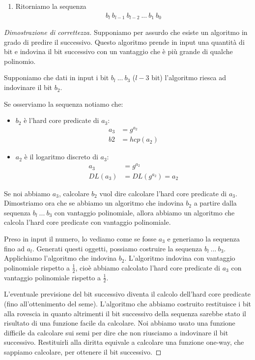 \begin{enumerate}
    \item Ritorniamo la sequenza
    \begin{align*}
        b_{l} \ b_{l-1} \ b_{l-2} \ ... \ b_{1} \ b_{0}
    \end{align*}
       
\end{enumerate}

\begin{proof}[Dimostrazione di correttezza]
    Supponiamo per assurdo che esiste un algoritmo in grado di predire il successivo. Questo algoritmo prende in input una quantità di bit e indovina il bit successivo con un vantaggio che è più grande di qualche polinomio. 

    Supponiamo che dati in input i bit $b_l \ ... \ b_3$ ($l-3$ bit) l'algoritmo riesca ad indovinare il bit $b_2$. 

    Se osserviamo la sequenza notiamo che:
    \begin{itemize}
        \item $b_2$ è l'hard core predicate di $a_3$:
        \begin{align*}
            a_3 &= g^{a_2}\\
            b2 &= hcp(a_2)
        \end{align*}
        \item $a_2$ è il logaritmo discreto di $a_3$:
        \begin{align*}
            a_3 &= g^{a_2}\\
           DL(a_3) &= DL(g^{a_2}) = a_2
        \end{align*}
    \end{itemize}

    \noindent Se noi abbiamo $a_3$, calcolare $b_2$ vuol dire calcolare l'hard core predicate di $a_3$. Dimostriamo ora che se abbiamo un algoritmo che indovina $b_2$ a partire dalla sequenza $b_l \ ... \ b_3$ con vantaggio polinomiale, allora abbiamo un algoritmo che calcola l'hard core predicate con vantaggio polinomiale. 

    Preso in input il numero, lo vediamo come se fosse $a_3$ e generiamo la sequenza fino ad $a_l$. Generati questi oggetti, possiamo costruire la sequenza $b_l \ ... \ b_3$. Applichiamo l'algoritmo che indovina $b_2$. L'algoritmo indovina con vantaggio polinomiale rispetto a $\frac{1}{2}$, cioè abbiamo calcolato l'hard core predicate di $a_3$ con vantaggio polinomiale rispetto a $\frac{1}{2}$.

    L'eventuale previsione del bit successivo diventa il calcolo dell'hard core predicate (fino all'ottenimento del seme). L'algoritmo che abbiamo costruito restituisce i bit alla rovescia in quanto altrimenti il bit successivo della sequenza sarebbe stato il risultato di una funzione facile da calcolare. Noi abbiamo usato una funzione difficile da calcolare sui semi per dire che non riusciamo a indovinare il bit successivo. Restituirli alla diritta equivale a calcolare una funzione one-way, che sappiamo calcolare, per ottenere il bit successivo.


\end{proof}
